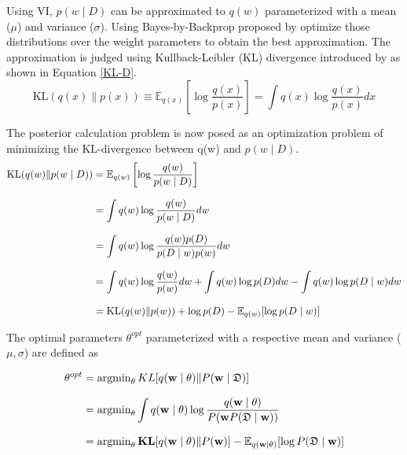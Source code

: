     Using VI, $p(w \mid D)$ can be approximated to $q(w)$ parameterized with a mean ($\mu$) and variance ($\sigma$). Using Bayes-by-Backprop proposed by \citet{WBAW1991, Blundell2015} optimize those distributions over the weight parameters to obtain the best approximation. The approximation is judged using Kullback-Leibler (KL) divergence introduced by \citet{Kullback1959} as shown in Equation \ref{KL-D}.
        \begin{equation}
            \label{KL-D}
            \mathrm{KL}(q(x) \| p(x)) \equiv \mathbb{E}_{q(x)}\left[\log \frac{q(x)}{p(x)}\right]=\int q(x) \log \frac{q(x)}{p(x)} d x
        \end{equation}
        
    The posterior calculation problem is now posed as an optimization problem of minimizing the KL-divergence between q(w) and $p(w \mid D)$.
        \begin{equation}
        \setlength{\jot}{10pt}
        \label{log_calc}
            \begin{aligned}
            \mathrm{KL}(q(w) \| p(w \mid D)) &=\mathbb{E}_{q(w)}\left[\log \frac{q(w)}{p(w \mid D)}\right] \\
            &=\int q(w) \log \frac{q(w)}{p(w \mid D)} d w \\
            &=\int q(w) \log \frac{q(w) p(D)}{p(D \mid w) p(w)} d w \\
            &=\int q(w) \log \frac{q(w)}{p(w)} d w+\int q(w) \log p(D) d w- \int q(w) \log p(D \mid w) d w \\
            &=\operatorname{KL}(q(w) \| p(w))+\log p(D)-\mathbb{E}_{q(w)}[\log p(D \mid w)]
            \end{aligned}
        \end{equation}
        
    The optimal parameters $\theta^{opt}$ parameterized with a respective mean and variance ($\mu , \sigma$) are defined as  
        
        \begin{equation}
        \setlength{\jot}{10pt}
        \label{optim_param}
            \begin{aligned}
            \theta^{opt} &=\operatorname{argmin}_{\theta} K L[q(\mathbf{w} \mid \theta) \| P(\mathbf{w} \mid \mathfrak{D})] \\
            &=\operatorname{argmin}_{\theta} \int q(\mathbf{w} \mid \theta) \log \frac{q(\mathbf{w} \mid \theta)}{P(\mathbf{w} P(\mathfrak{D} \mid \mathbf{w}))} \\
            &=\operatorname{argmin}_{\theta} \mathbf{K L}[q(\mathbf{w} \mid \theta) \| P(\mathbf{w})]-\mathbb{E}_{q(\mathbf{w} \mid \theta)}[\log P(\mathfrak{D} \mid \mathbf{w})]
            \end{aligned}
        \end{equation}
        

